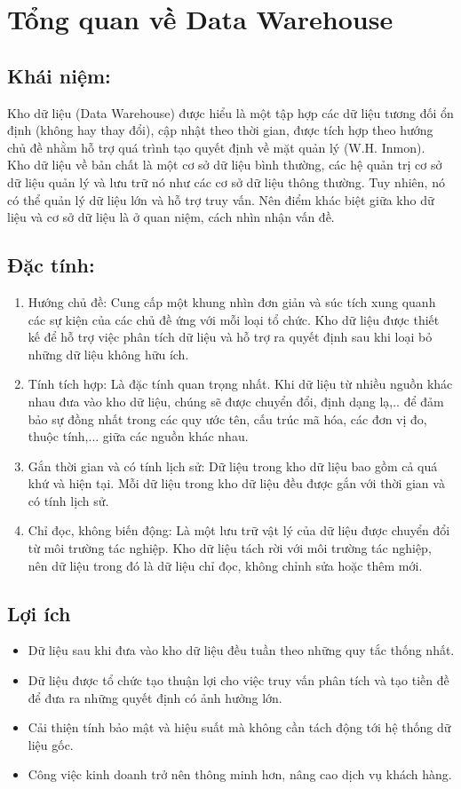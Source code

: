 \section{Tổng quan về Data Warehouse}
\subsection{Khái niệm:}
Kho dữ liệu (Data Warehouse) được hiểu là một tập hợp các dữ liệu tương đối ổn định (không hay thay đổi), cập nhật theo thời gian, được tích hợp theo hướng chủ đề nhằm hỗ trợ quá trình tạo quyết định về mặt quản lý (W.H. Inmon).\\

Kho dữ liệu về bản chất là một cơ sở dữ liệu bình thường, các hệ quản trị cơ sở dữ liệu quản lý và lưu trữ nó như các cơ sở dữ liệu thông thường. Tuy nhiên, nó có thể quản lý dữ liệu lớn và hỗ trợ truy vấn. Nên điểm khác biệt giữa kho dữ liệu và cơ sở dữ liệu là ở quan niệm, cách nhìn nhận vấn đề.

\subsection{Đặc tính:}
\begin{enumerate}
    \item Hướng chủ đề: Cung cấp một khung nhìn đơn giản và súc tích xung quanh các sự kiện của các chủ đề ứng với mỗi loại tổ chức. Kho dữ liệu được thiết kế để hỗ trợ việc phân tích dữ liệu và hỗ trợ ra quyết định sau khi loại bỏ những dữ liệu không hữu ích.
    \item Tính tích hợp: Là đặc tính quan trọng nhất. Khi dữ liệu từ nhiều nguồn khác nhau đưa vào kho dữ liệu, chúng sẽ được chuyển đổi, định dạng lạ,.. để đảm bảo sự đồng nhất trong các quy ước tên, cấu trúc mã hóa, các đơn vị đo, thuộc tính,... giữa các nguồn khác nhau.
    \item Gắn thời gian và có tính lịch sử: Dữ liệu trong kho dữ liệu bao gồm cả quá khứ và hiện tại. Mỗi dữ liệu trong kho dữ liệu đều được gắn với thời gian và có tính lịch sử.
    \item Chỉ đọc, không biến động: Là một lưu trữ vật lý của dữ liệu được chuyển đổi từ môi trường tác nghiệp. Kho dữ liệu tách rời với môi trường tác nghiệp, nên dữ liệu trong đó là dữ liệu chỉ đọc, không chỉnh sửa hoặc thêm mới.
\end{enumerate}
\subsection{Lợi ích}
\begin{itemize}[label=$-$]
    \item Dữ liệu sau khi đưa vào kho dữ liệu đều tuần theo những quy tắc thống nhất.
    \item Dữ liệu được tổ chức tạo thuận lợi cho việc truy vấn phân tích và tạo tiền đề để đưa ra những quyết định có ảnh hưởng lớn.
    \item Cải thiện tính bảo mật và hiệu suất mà không cần tách động tới hệ thống dữ liệu gốc.
    \item Công việc kinh doanh trở nên thông minh hơn, nâng cao dịch vụ khách hàng.
\end{itemize}

